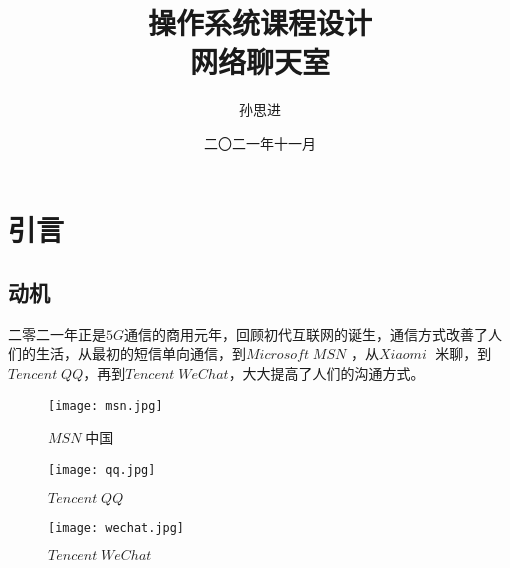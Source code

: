 \documentclass[forprint]{OSPaper}
\begin{document}

\miji{ }                                      %

\title{操作系统课程设计\\网络聊天室}
\author{孙思进}                            %
\date{二〇二一年十一月}                    %

\maketitle
\frontmatter
{}              %
\tableofcontents
\mainmatter %
\chapter{引言}
\section{动机}
二零二一年正是$ 5G $通信的商用元年，回顾初代互联网的诞生，通信方式改善了人们的生活，从最初的短信单向通信，到$ Microsoft \; MSN$ ，从$ Xiaomi \;$ 米聊，到 $Tencent \; QQ $，再到$Tencent \; WeChat$，大大提高了人们的沟通方式。

\begin{figure}[ht]
	\centering
	\begin{minipage}[t]{0.33\linewidth}
		\centering
		\texttt{[image: msn.jpg]}
		\caption{$MSN \;$中国}
		\label{fig:1}
	\end{minipage}%
	\begin{minipage}[t]{0.33\linewidth}
		\centering
		\texttt{[image: qq.jpg]}
		\caption{$Tencent \; QQ $}
		\label{fig:2}
	\end{minipage}%
	\begin{minipage}[t]{0.33\linewidth}
		\centering
		\texttt{[image: wechat.jpg]}
		\caption{$Tencent \; WeChat $}
		\label{fig:3}
	\end{minipage}%
\end{figure}
\end{document}
